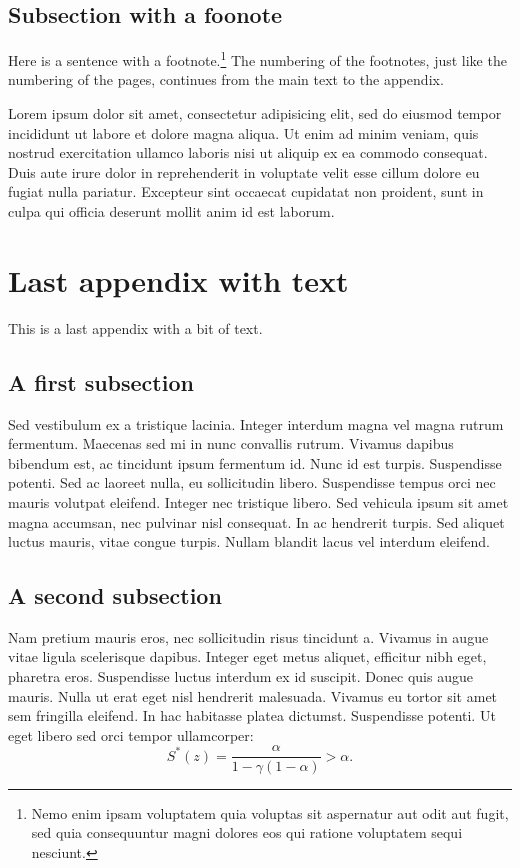 \documentclass[letterpaper,11pt,leqno]{article}
\begin{document}
\subsection{Subsection with a foonote}

Here is a sentence with a footnote.\footnote{Nemo enim ipsam voluptatem quia voluptas sit aspernatur aut odit aut fugit, sed quia consequuntur magni dolores eos qui ratione voluptatem sequi nesciunt.} The numbering of the footnotes, just like the numbering of the pages, continues from the main text to the appendix.

Lorem ipsum dolor sit amet, consectetur adipisicing elit, sed do eiusmod tempor incididunt ut labore et dolore magna aliqua. Ut enim ad minim veniam,
quis nostrud exercitation ullamco laboris nisi ut aliquip ex ea commodo
consequat. Duis aute irure dolor in reprehenderit in voluptate velit esse
cillum dolore eu fugiat nulla pariatur. Excepteur sint occaecat cupidatat non
proident, sunt in culpa qui officia deserunt mollit anim id est laborum.

\section{Last appendix with text}

This is a last appendix with a bit of text.

\subsection{A first subsection}

Sed vestibulum ex a tristique lacinia. Integer interdum magna vel magna rutrum fermentum. Maecenas sed mi in nunc convallis rutrum. Vivamus dapibus bibendum est, ac tincidunt ipsum fermentum id. Nunc id est turpis. Suspendisse potenti. Sed ac laoreet nulla, eu sollicitudin libero. Suspendisse tempus orci nec mauris volutpat eleifend. Integer nec tristique libero. Sed vehicula ipsum sit amet magna accumsan, nec pulvinar nisl consequat. In ac hendrerit turpis. Sed aliquet luctus mauris, vitae congue turpis. Nullam blandit lacus vel interdum eleifend. 

\subsection{A second subsection}

Nam pretium mauris eros, nec sollicitudin risus tincidunt a. Vivamus in augue vitae ligula scelerisque dapibus. Integer eget metus aliquet, efficitur nibh eget, pharetra eros. Suspendisse luctus interdum ex id suscipit. Donec quis augue mauris. Nulla ut erat eget nisl hendrerit malesuada. Vivamus eu tortor sit amet sem fringilla eleifend. In hac habitasse platea dictumst. Suspendisse potenti. Ut eget libero sed orci tempor ullamcorper:
\begin{equation}
S^*(z) = \frac{\alpha}{1-\gamma (1-\alpha)} > \alpha.
\label{e:type1Classical}\end{equation}
\end{document}
